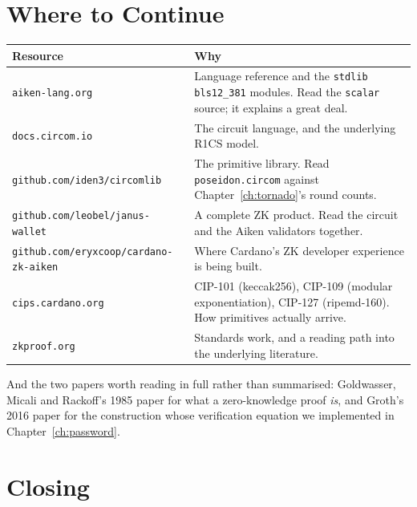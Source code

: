 \section{Where to Continue} \label{sec:ch9-resources}

\begin{center}
\begin{tabular}{p{5.1cm}p{6.9cm}}
  \hline
  \textbf{Resource} & \textbf{Why} \\
  \hline
  \texttt{aiken-lang.org}
    & Language reference and the \texttt{stdlib} \texttt{bls12\_381} modules.
      Read the \texttt{scalar} source; it explains a great deal. \\
  \addlinespace
  \texttt{docs.circom.io}
    & The circuit language, and the underlying R1CS model. \\
  \addlinespace
  \texttt{github.com/iden3/circomlib}
    & The primitive library. Read \texttt{poseidon.circom} against
      Chapter~\ref{ch:tornado}'s round counts. \\
  \addlinespace
  \texttt{github.com/leobel/janus-wallet}
    & A complete ZK product. Read the circuit and the Aiken validators
      together. \\
  \addlinespace
  \texttt{github.com/eryxcoop/cardano-zk-aiken}
    & Where Cardano's ZK developer experience is being built. \\
  \addlinespace
  \texttt{cips.cardano.org}
    & CIP-101 (keccak256), CIP-109 (modular exponentiation), CIP-127
      (ripemd-160). How primitives actually arrive. \\
  \addlinespace
  \texttt{zkproof.org}
    & Standards work, and a reading path into the underlying literature. \\
  \hline
\end{tabular}
\end{center}

And the two papers worth reading in full rather than summarised: Goldwasser,
Micali and Rackoff's 1985 paper for what a zero-knowledge proof \emph{is}, and
Groth's 2016 paper for the construction whose verification equation we
implemented in Chapter~\ref{ch:password}.

\section{Closing} \label{sec:ch9-closing}

